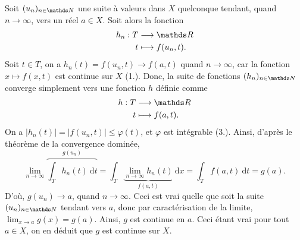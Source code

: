 \begin{prv}
	Soit $(u_n)_{n\in\N}$\/ une suite à valeurs dans $X$\/ quelconque tendant, quand $n\to \infty$, vers un réel $a \in X$.
	Soit alors la fonction \begin{align*}
		h_n: T &\longrightarrow \R \\
		t &\longmapsto f(u_n, t).
	\end{align*}
	Soit $t \in T$, on a $h_n(t) = f(u_n, t) \longrightarrow f(a, t)$\/ quand $n \to \infty$, car la fonction $x \mapsto f(x, t)$\/ est continue sur $X$ (1.). Donc, la suite de fonctions $(h_n)_{n\in\N}$\/ converge simplement vers une fonction $h$\/ définie comme \begin{align*}
		h: T &\longrightarrow \R \\
		t &\longmapsto f(a,t).
	\end{align*}
	On a $\left| h_n(t) \right| = \left| f(u_n, t) \right| \le \varphi(t)$, et $\varphi$\/ est intégrable (3.). Ainsi, d'après le théorème de la convergence dominée, \[
		\lim_{n\to \infty} \overbrace{\int_{T} h_n(t) ~\mathrm{d}t}^{g(u_n)}  = \int_{T} \underbrace{\lim_{n\to \infty} h_n(t)}_{f(a,t)}~\mathrm{d}x = \int_{T} f(a,t)~\mathrm{d}t = g(a)
	.\]
	D'où, $g(u_n) \longrightarrow a$, quand $n \to \infty$. Ceci est vrai quelle que soit la suite $(u_n)_{n\in\N}$\/ tendant vers $a$, donc par caractérisation de la limite, $\lim_{x\to a} g(x) = g(a)$. Ainsi, $g$\/ est continue en $a$. Ceci étant vrai pour tout $a \in X$, on en déduit que $g$\/ est continue sur $X$.
\end{prv}

\bigskip


